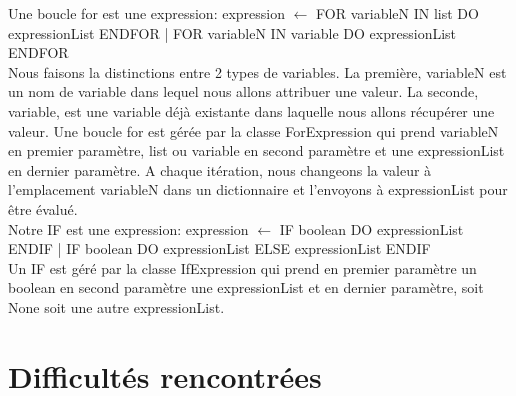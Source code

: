 ﻿\documentclass{report}
\begin{document}

Une boucle for est une expression: expression $\leftarrow$ FOR variableN IN list DO expressionList ENDFOR | FOR variableN IN variable DO expressionList ENDFOR\\ 
Nous faisons la distinctions entre 2 types de variables. La première, variableN est un nom de variable dans lequel nous allons attribuer une valeur. La seconde, variable, est une variable déjà existante dans laquelle nous allons récupérer une valeur. Une boucle for est gérée par la classe ForExpression qui prend variableN en premier paramètre, list ou variable en second paramètre et une expressionList en dernier paramètre. A chaque itération, nous changeons la valeur à l'emplacement variableN dans un dictionnaire et l'envoyons à expressionList pour être évalué.\\

Notre IF est une expression: expression $\leftarrow$ IF boolean DO expressionList ENDIF | IF boolean DO expressionList ELSE expressionList ENDIF\\
Un IF est géré par la classe IfExpression qui prend en premier paramètre un boolean en second paramètre une expressionList et en dernier paramètre, soit None soit une autre expressionList.


\section*{ Difficultés rencontrées }
\end{document}
